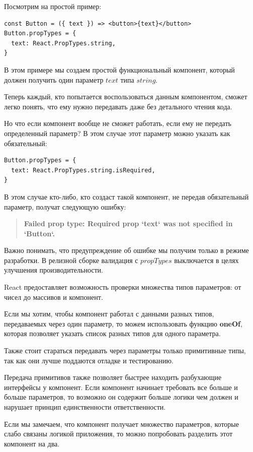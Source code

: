 Посмотрим на простой пример:

\begin{lstlisting}
const Button = ({ text }) => <button>{text}</button>
Button.propTypes = {
  text: React.PropTypes.string,
}
\end{lstlisting}

В этом примере мы создаем простой функциональный компонент, который должен получить один параметр $text$ типа $string$.

Теперь каждый, кто попытается воспользоваться данным компонентом, сможет легко понять, что ему нужно передавать даже без детального чтения кода.

Но что если компонент вообще не сможет работать, если ему не передать определенный параметр? В этом случае этот параметр можно указать как обязательный:

\begin{lstlisting}
Button.propTypes = {
  text: React.PropTypes.string.isRequired,
}
\end{lstlisting}

В этом случае кто-либо, кто создаст такой компонент, не передав обязательный параметр, получат следующую ошибку:

\begin{quotation}
\textbf{Failed prop type: Required prop `text` was not specified in `Button`.}
\end{quotation}

Важно понимать, что предупреждение об ошибке мы получим только в режиме разработки. В релизной сборке валидация с $propTypes$ выключается в целях улучшения производительности.

React предоставляет возможность проверки множества типов параметров: от чисел до массивов и компонент.

Если мы хотим, чтобы компонент работал с данными разных типов, передаваемых через один параметр, то можем использовать функцию \textbf{oneOf}, которая позволяет указать список разных типов для одного параметра.

Также стоит стараться передавать через параметры только примитивные типы, так как они лучше поддаются отладке и тестированию.

Передача примитивов также позволяет быстрее находить разбухающие интерфейсы у компонент. Если компонент начинает требовать все больше и больше параметров, то возможно он содержит больше логики чем должен и нарушает принцип единственности ответственности.

Если мы замечаем, что компонент получает множество параметров, которые слабо связаны логикой приложения, то можно попробовать разделить этот компонент на два.

